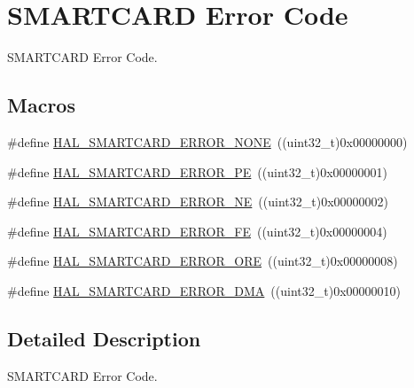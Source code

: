 \hypertarget{group___s_m_a_r_t_c_a_r_d___error___code}{}\section{S\+M\+A\+R\+T\+C\+A\+RD Error Code}
\label{group___s_m_a_r_t_c_a_r_d___error___code}


S\+M\+A\+R\+T\+C\+A\+RD Error Code.  


\subsection*{Macros}
\begin{DoxyCompactItemize}
\item 
\#define \hyperlink{group___s_m_a_r_t_c_a_r_d___error___code_ga0a10397d49336206efa6dce68b1c34a0}{H\+A\+L\+\_\+\+S\+M\+A\+R\+T\+C\+A\+R\+D\+\_\+\+E\+R\+R\+O\+R\+\_\+\+N\+O\+NE}~((uint32\+\_\+t)0x00000000)
\item 
\#define \hyperlink{group___s_m_a_r_t_c_a_r_d___error___code_gaa84e746eaf686e07ef7b9c2e3afd11a8}{H\+A\+L\+\_\+\+S\+M\+A\+R\+T\+C\+A\+R\+D\+\_\+\+E\+R\+R\+O\+R\+\_\+\+PE}~((uint32\+\_\+t)0x00000001)
\item 
\#define \hyperlink{group___s_m_a_r_t_c_a_r_d___error___code_ga5050fe3b494349674dea76bebb837943}{H\+A\+L\+\_\+\+S\+M\+A\+R\+T\+C\+A\+R\+D\+\_\+\+E\+R\+R\+O\+R\+\_\+\+NE}~((uint32\+\_\+t)0x00000002)
\item 
\#define \hyperlink{group___s_m_a_r_t_c_a_r_d___error___code_gaa8166c45a9433d9840d33a047c9bb0c0}{H\+A\+L\+\_\+\+S\+M\+A\+R\+T\+C\+A\+R\+D\+\_\+\+E\+R\+R\+O\+R\+\_\+\+FE}~((uint32\+\_\+t)0x00000004)
\item 
\#define \hyperlink{group___s_m_a_r_t_c_a_r_d___error___code_ga6e65c29c6be8407ab5773b3f8d0795cc}{H\+A\+L\+\_\+\+S\+M\+A\+R\+T\+C\+A\+R\+D\+\_\+\+E\+R\+R\+O\+R\+\_\+\+O\+RE}~((uint32\+\_\+t)0x00000008)
\item 
\#define \hyperlink{group___s_m_a_r_t_c_a_r_d___error___code_ga52171ccaca1197e42db9d2a08bc77c63}{H\+A\+L\+\_\+\+S\+M\+A\+R\+T\+C\+A\+R\+D\+\_\+\+E\+R\+R\+O\+R\+\_\+\+D\+MA}~((uint32\+\_\+t)0x00000010)
\end{DoxyCompactItemize}


\subsection{Detailed Description}
S\+M\+A\+R\+T\+C\+A\+RD Error Code. 



